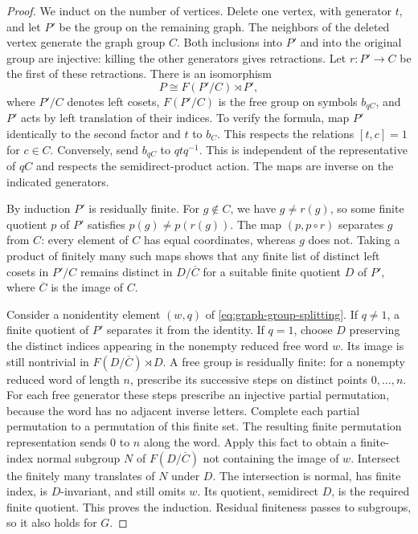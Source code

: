 \begin{proof}
We induct on the number of vertices.  Delete one vertex, with
generator $t$, and let $P'$ be the group on the remaining graph.
The neighbors of the deleted vertex generate the graph group $C$.
Both inclusions into $P'$ and into the original group are injective:
killing the other generators gives retractions.  Let
$r:P'\to C$ be the first of these retractions.  There is an isomorphism
\begin{equation}\label{eq:graph-group-splitting}
 P\cong F(P'/C)\rtimes P',
\end{equation}
where $P'/C$ denotes left cosets, $F(P'/C)$ is the free group on
symbols $b_{qC}$, and $P'$ acts by left translation of their indices.
To verify the formula, map $P'$ identically to the second factor and
$t$ to $b_C$.  This respects the relations $[t,c]=1$ for $c\in C$.
Conversely, send $b_{qC}$ to $qtq^{-1}$.  This is independent of the
representative of $qC$ and respects the semidirect-product action.
The maps are inverse on the indicated generators.

By induction $P'$ is residually finite.  For $g\notin C$, we have
$g\ne r(g)$, so some finite quotient $p$ of $P'$ satisfies
$p(g)\ne p(r(g))$.  The map $(p,p\circ r)$ separates $g$ from $C$:
every element of $C$ has equal coordinates, whereas $g$ does not.
Taking a product of finitely many such maps shows that any finite
list of distinct left cosets in $P'/C$ remains distinct in
$D/\overline C$ for a suitable finite quotient $D$ of $P'$, where
$\overline C$ is the image of $C$.

Consider a nonidentity element $(w,q)$ of
\eqref{eq:graph-group-splitting}.  If $q\ne1$, a finite quotient of
$P'$ separates it from the identity.  If $q=1$, choose $D$ preserving
the distinct indices appearing in the nonempty reduced free word
$w$.  Its image is still nontrivial in
$F(D/\overline C)\rtimes D$.  A free group is residually finite:
for a nonempty reduced word of length $n$, prescribe its successive
steps on distinct points $0,\ldots,n$.  For each free generator these
steps prescribe an injective partial permutation, because the word
has no adjacent inverse letters.  Complete each partial permutation
to a permutation of this finite set.  The resulting finite
permutation representation sends $0$ to $n$ along the word.
Apply this fact to obtain a finite-index normal subgroup $N$ of
$F(D/\overline C)$ not containing the image of $w$.  Intersect the
finitely many translates of $N$ under $D$.  The intersection is
normal, has finite index, is $D$-invariant, and still omits $w$.
Its quotient, semidirect $D$, is the required finite quotient.
This proves the induction.  Residual finiteness passes to subgroups,
so it also holds for $G$.
\end{proof}

